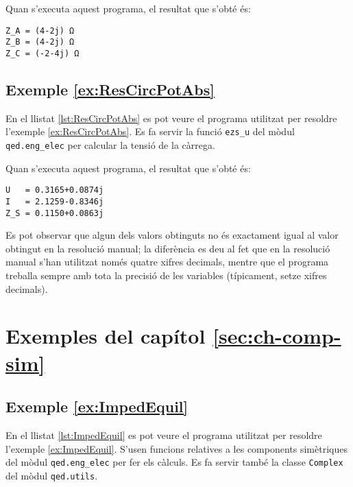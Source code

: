 Quan s'executa aquest programa, el resultat que s'obté és:
\lstset{
	language=,
	numbers=none,
	frame=none
}
\begin{lstlisting}
Z_A = (4-2j) Ω
Z_B = (4-2j) Ω
Z_C = (-2-4j) Ω
\end{lstlisting}


\hypertarget{exemple:ResCircPotAbs}{\subsection{Exemple \ref*{ex:ResCircPotAbs} \ResCircPotAbs}}
En el llistat \vref{lst:ResCircPotAbs} es pot veure el programa utilitzat per resoldre l'exemple \vref{ex:ResCircPotAbs}. Es fa servir la funció \texttt{ezs\_u} del mòdul \texttt{qed.eng\_elec} per calcular la tensió de la càrrega.


Quan s'executa aquest programa, el resultat que s'obté és:
\lstset{
	language=,
	numbers=none,
	frame=none
}
\begin{lstlisting}
U   = 0.3165+0.0874j
I   = 2.1259-0.8346j
Z_S = 0.1150+0.0863j
\end{lstlisting}

Es pot observar que algun dels valors obtinguts no és exactament igual al valor obtingut en la resolució manual; la diferència es deu al fet que en la resolució manual s'han utilitzat només quatre xifres decimals, mentre que el programa treballa sempre amb tota la precisió de les variables (típicament, setze xifres decimals).



\section{Exemples del capítol \ref*{sec:ch-comp-sim}}

\hypertarget{exemple:ImpedEquil}{\subsection{Exemple \ref*{ex:ImpedEquil} \ImpedEquil}}
En el llistat \vref{lst:ImpedEquil} es pot veure el programa utilitzat per resoldre l'exemple \vref{ex:ImpedEquil}. S'usen funcions relatives a les components simètriques del mòdul \texttt{qed.eng\_elec} per fer els càlculs. Es fa servir també la classe \texttt{Complex} del mòdul \texttt{qed.utils}.


